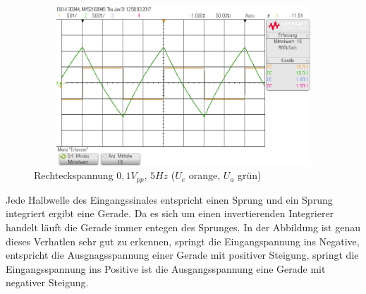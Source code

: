 \begin{figure}[H]
 \begin{center}
  \includegraphics[height=6cm,width=12cm]{OsziBilder/invInte_bigScal.png}
 \end{center}
 \caption{Rechteckspannung $0,1V_{pp}$, $5Hz$ ($U_e$ orange, $U_a$ grün)}
\end{figure}
Jede Halbwelle des Eingangssinales entspricht einen Sprung und ein Sprung integriert ergibt eine Gerade. Da es sich um einen invertierenden Integrierer handelt l\"auft die Gerade immer entegen des Sprunges. In der Abbildung ist genau dieses Verhatlen sehr gut zu erkennen, springt die Eingangspannung ins Negative, entspricht die Ausgnagsspannung einer Gerade mit positiver Steigung, springt die Eingangsspannung ins Positive ist die Ausgangsspannung eine Gerade mit negativer Steigung.
\newpage
